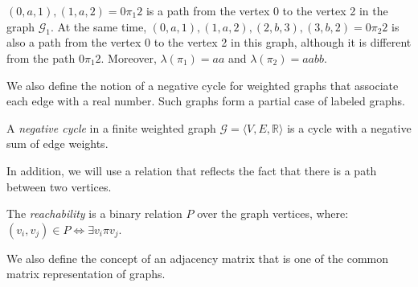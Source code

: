 \begin{example}
	$(0, a, 1), (1, a, 2) = 0 \pi_1 2$ is a path from the vertex 0 to the vertex 2 in the graph $\mathcal{G}_1$.
	At the same time, $(0, a, 1), (1, a, 2), (2, b, 3), (3, b, 2) = 0 \pi_2 2$ is also a path from the vertex 0 to the vertex 2 in this graph, although it is different from the path $0 \pi_1 2$. Moreover, $\lambda(\pi_1) = aa$ and $\lambda(\pi_2) = aabb$.
\end{example}

We also define the notion of a negative cycle for weighted graphs that associate each edge with a real number. Such graphs form a partial case of labeled graphs.

\begin{definition}
	A \textit{negative cycle} in a finite weighted graph $\mathcal{G} = \langle V, E, \mathbb{R} \rangle$ is a cycle with a negative sum of edge weights.
\end{definition}

In addition, we will use a relation that reflects the fact that there is a path between two vertices.

\begin{definition} \label{def:reach}
	The \textit{reachability} is a binary relation $P$ over the graph vertices, where:
	$(v_i, v_j) \in P \iff \exists v_i \pi v_j$.
\end{definition}

We also define the concept of an adjacency matrix that is one of the common matrix representation of graphs.

